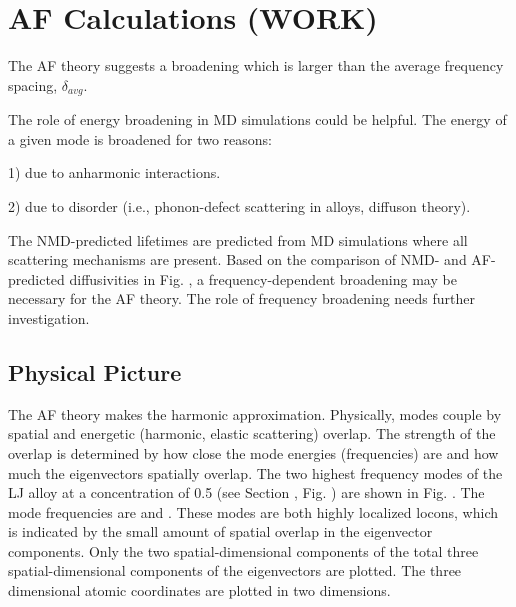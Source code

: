 \section{\label{Appendix:AF}AF Calculations (WORK)}



The AF theory suggests a broadening which is larger than the average 
frequency spacing, $\delta_{avg}$. 

The role of energy broadening in MD simulations could be helpful. The 
energy of a given mode is broadened for two reasons: 

1) due to anharmonic interactions.

2) due to disorder (i.e., phonon-defect scattering in alloys, 
diffuson theory). 

The NMD-predicted lifetimes are predicted from MD simulations where 
all scattering mechanisms are present. Based on the comparison 
of NMD- and AF-predicted diffusivities in Fig. , a frequency-dependent 
broadening may be necessary for the AF theory. The role of frequency 
broadening needs further investigation. 

\subsection{\label{Appendix:AF:Physical}Physical Picture}

The AF theory makes the harmonic approximation. Physically, modes 
couple by spatial and energetic (harmonic, elastic scattering) overlap.  
The strength of the overlap is determined by how close the mode 
energies (frequencies) are and how much the eigenvectors spatially overlap. 
The two highest frequency modes of the LJ alloy at a concentration of 
0.5 (see Section , Fig. ) are shown in Fig. . The mode frequencies are 
and . These modes are both highly localized locons, which is indicated 
by the small amount of spatial overlap in the eigenvector components. Only 
the two spatial-dimensional components of the total three 
spatial-dimensional components of the eigenvectors are plotted. The 
three dimensional atomic coordinates are plotted in two dimensions. 

